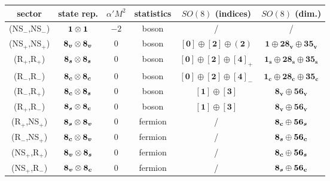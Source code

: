 \begin{tabular}{|c|c|c|c|c|c|}
    \hline    sector & state rep. & $\alpha' M^2$ & statistics & $SO(8)$ (indices) & $SO(8)$ (dim.)  \\ \hline
        (NS$_-$,NS$_-$) & $\boldsymbol{1} \otimes \boldsymbol{1}$ & $-2$ & boson & / & / \\ \hline
        (NS$_+$,NS$_+$) &$\boldsymbol{8_v} \otimes \boldsymbol{8_v}$&$0$& boson& $[\boldsymbol{0}] \oplus [\boldsymbol{2}] \oplus (\boldsymbol{2})$ &$\boldsymbol{1} \oplus \boldsymbol{28_v} \oplus \boldsymbol{35_v}$\\ \hline
        (R$_+$,R$_+$) &$\boldsymbol{8_s}\otimes \boldsymbol{8_s}$&$0$& boson & $[\boldsymbol{0}] \oplus [\boldsymbol{2}] \oplus [\boldsymbol{4}]_+$ & $\boldsymbol{1_s} \oplus \boldsymbol{28_s} \oplus \boldsymbol{35_s}$ \\ \hline
        (R$_-$,R$_-$) &$\boldsymbol{8_c} \otimes \boldsymbol{8_c}$&$0$& boson & $[\boldsymbol{0}] \oplus [\boldsymbol{2}] \oplus [\boldsymbol{4}]_-$ & $\boldsymbol{1_c} \oplus \boldsymbol{28_c} \oplus \boldsymbol{35_c}$\\ \hline
        (R$_-$,R$_+$) &$\boldsymbol{8_c} \otimes \boldsymbol{8_s}$&$0$& boson & $[\boldsymbol{1}] \oplus [\boldsymbol{3}]$ & $\boldsymbol{8_v} \oplus \boldsymbol{56_v}$\\ \hline
        (R$_+$,R$_-$) &$\boldsymbol{8_s} \otimes \boldsymbol{8_c}$&$0$& boson& $[\boldsymbol{1}] \oplus [\boldsymbol{3}]$& $\boldsymbol{8_v} \oplus \boldsymbol{56_v}$\\ \hline
        (R$_+$,NS$_+$) &$\boldsymbol{8_s} \otimes \boldsymbol{8_v}$&$0$& fermion & / & $\boldsymbol{8_c} \oplus \boldsymbol{56_s}$\\ \hline
        (R$_-$,NS$_+$) &$\boldsymbol{8_c} \otimes \boldsymbol{8_v}$&$0$& fermion & / & $\boldsymbol{8_s} \oplus \boldsymbol{56_c}$\\ \hline
        (NS$_+$,R$_+$) &$\boldsymbol{8_v}\otimes\boldsymbol{8_s}$&$0$& fermion & / & $\boldsymbol{8_c} \oplus \boldsymbol{56_s}$\\ \hline
        (NS$_+$,R$_-$) &$\boldsymbol{8_v}\otimes\boldsymbol{8_c}$&$0$& fermion & / & $\boldsymbol{8_s} \oplus \boldsymbol{56_c}$ \\ \hline
    \end{tabular}